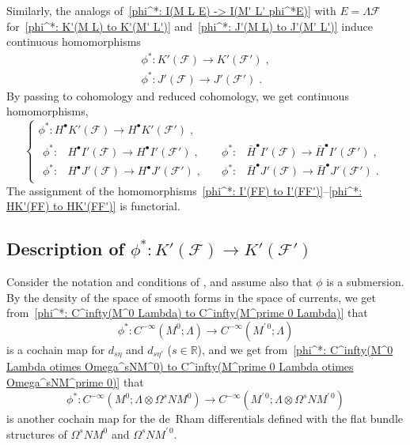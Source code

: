 \documentclass{memo-l}
\theoremstyle{plain}
\theoremstyle{definition}
\theoremstyle{remark}
\newcommand{\R}{\mathbb{R}}
\newcommand{\FF}{\mathcal{F}}
\numberwithin{section}{chapter}
\numberwithin{equation}{section}%
\begin{document}
Similarly, the analogs of~\eqref{phi^*: I(M L E) -> I(M' L' phi^*E)} with $E=\Lambda\FF$ for~\eqref{phi^*: K'(M L) to K'(M' L')} and~\eqref{phi^*: J'(M L) to J'(M' L')} induce continuous homomorphisms
\begin{gather}
\phi^*:K'(\FF)\to K'(\FF')\;,\label{phi^*: K'(FF) to K'(FF')}\\
\phi^*:J'(\FF)\to J'(\FF')\;.\label{phi^*: J'(FF) to J'(FF')}
\end{gather}
By passing to cohomology and reduced cohomology, we get continuous homomorphisms,
\begin{equation}\label{phi^*: HK'(FF) to HK'(FF')}
\left\{
\begin{gathered}
\phi^*:H^\bullet K'(\FF)\to H^\bullet K'(\FF')\;,\\
\begin{alignedat}{2}
\phi^*:&H^\bullet I'(\FF)\to H^\bullet I'(\FF')\;,&\quad\phi^*:&\bar H^\bullet I'(\FF)\to\bar H^\bullet I'(\FF')\;,\\
\phi^*:&H^\bullet J'(\FF)\to H^\bullet J'(\FF')\;,&\quad\phi^*:&\bar H^\bullet J'(\FF)\to\bar H^\bullet J'(\FF')\;.
\end{alignedat}
\end{gathered}
\right.
\end{equation}
The assignment of the homomorphisms~\eqref{phi^*: I'(FF) to I'(FF')}--\eqref{phi^*: HK'(FF) to HK'(FF')} is functorial.



\subsection{Description of $\phi^*:K'(\FF)\to K'(\FF')$}\label{ss: description of phi^*:K'(FF) to K'(FF')}

Consider the notation and conditions of , and assume also that $\phi$ is a submersion. By the density of the space of smooth forms in the space of currents, we get from~\eqref{phi^*: C^infty(M^0 Lambda) to C^infty(M^prime 0 Lambda)} that
\begin{equation}\label{phi^*: C^-infty(M^0 Lambda) to C^-infty(M^prime 0 Lambda)}
\phi^*:C^{-\infty}(M^0;\Lambda)\to C^{-\infty}(M^{\prime\,0};\Lambda)
\end{equation}
is a cochain map for $d_{s\eta}$ and $d_{s\eta'}$ ($s\in\R$), and we get from~\eqref{phi^*: C^infty(M^0 Lambda otimes Omega^sNM^0) to C^infty(M^prime 0 Lambda otimes Omega^sNM^prime 0)} that
\begin{equation}
\label{phi^*: C^-infty(M^0 Lambda otimes Omega^sNM^0) to C^-infty(M^prime 0 Lambda otimes Omega^sNM^prime 0)}
\phi^*:C^{-\infty}(M^0;\Lambda\otimes\Omega^sNM^0)\to C^{-\infty}(M^{\prime\,0};\Lambda\otimes\Omega^sNM^{\prime\,0})
\end{equation} 
is another cochain map for the de~Rham differentials defined with the flat bundle structures of $\Omega^sNM^0$ and $\Omega^sNM^{\prime\,0}$.
\end{document}
